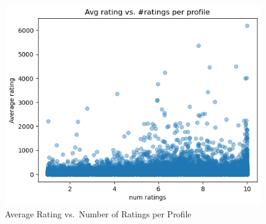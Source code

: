 \begin{figure}[ht]
  \centering
  \includegraphics[width=0.6\linewidth]{figures/output.png}
  \caption{Average Rating vs.\ Number of Ratings per Profile}
  \label{fig:rating-vs-count}
\end{figure}
